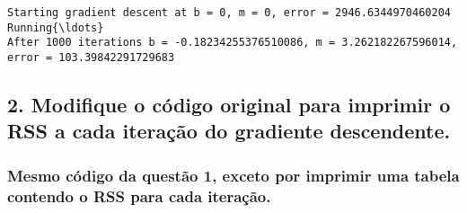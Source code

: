 \documentclass[11pt]{article}
\begin{document}
    \begin{Verbatim}[commandchars=\\\{\}]
Starting gradient descent at b = 0, m = 0, error = 2946.6344970460204
Running{\ldots}
After 1000 iterations b = -0.18234255376510086, m = 3.262182267596014, error = 103.39842291729683

    \end{Verbatim}

    \subsection{2. Modifique o código original para imprimir o RSS a cada
iteração do gradiente
descendente.}\label{modifique-o-cuxf3digo-original-para-imprimir-o-rss-a-cada-iterauxe7uxe3o-do-gradiente-descendente.}

\subsubsection{Mesmo código da questão 1, exceto por imprimir uma tabela
contendo o RSS para cada
iteração.}\label{mesmo-cuxf3digo-da-questuxe3o-1-exceto-por-imprimir-uma-tabela-contendo-o-rss-para-cada-iterauxe7uxe3o.}
\end{document}
